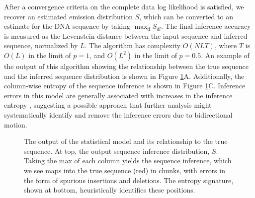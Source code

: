 \documentclass{biophys_letter}
\begin{document}
After a convergence criteria on the complete data log likelihood is satisfied, we recover an estimated emission distribution $S$, which can be converted to an estimate for the DNA sequence by taking $\mathrm{\max_{d}} {S_{dl}}$.
The final inference accuracy is measured as the Levenstein distance  between the input sequence and inferred sequence, normalized by $L$.
The algorithm has complexity $O(NLT)$, where $T$ is $O(L)$ in the limit of $p=1$, and $O(L^2)$ in the limit of $p=0.5$.
An example of the output of this algorithm showing the relationship between the true sequence and the inferred sequence distribution is shown in Figure \ref{fig:inference_output}A.
Additionally, the column-wise entropy of the sequence inference is shown in Figure \ref{fig:inference_output}C.
Inference errors in this model are generally associated with increases in the inference entropy , suggesting a possible approach that further analysis might systematically identify and remove the inference errors due to bidirectional motion.

\begin{figure}
  \caption{The output of the statistical model and its relationship to the true sequence. At top, the output sequence inference distribution, $S$. Taking the max of each column yields the sequence inference, which we see maps into the true sequence (red) in chunks, with errors in the form of spurious insertions and deletions. The entropy signature, shown at bottom, heuristically identifies these positions.}
\label{fig:inference_output}
\end{figure}
\end{document}
